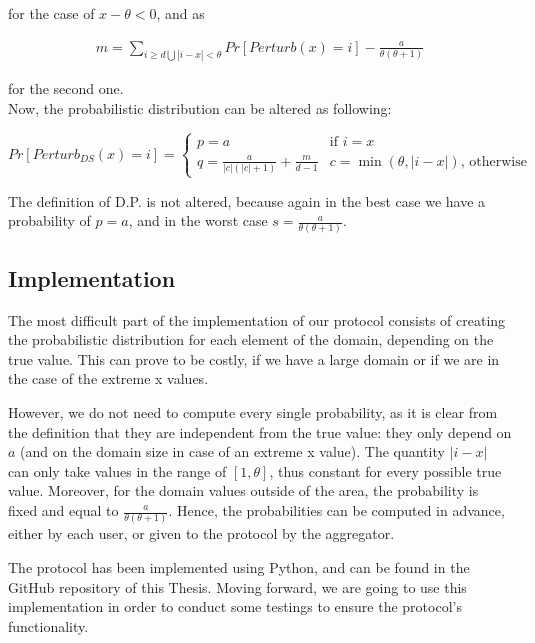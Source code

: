 for the case of $x - \theta < 0$, and as 

\begin{align*}
    m = \sum_{i \geq d \bigcup |i-x|<\theta} Pr[Perturb(x) = i] - \frac{a}{\theta(\theta+1)}
\end{align*}

for the second one.
\\\bigskip
Now, the probabilistic distribution can be altered as following: 


\begin{equation*}
    Pr[Perturb_{DS}(x) = i] =
	\begin{cases}
		p = a & \mbox{if } i = x \\
		q = \frac{a}{|c|(|c| + 1)} + \frac{m}{d - 1}  &  c = \min{(\theta, |i-x|)}  \mbox{, otherwise}	\end{cases}
\end{equation*}
 

The definition of D.P. is not altered, because again in the best case we have a probability of $p = a$, and in the worst case $s = \frac{a}{\theta(\theta+1)}$.

\subsection{Implementation}

The most difficult part of the implementation of our protocol consists of creating the probabilistic distribution for each element of the domain, depending on the true value. This can prove to be costly, if we have a large domain or if we are in the case of the extreme x values.

However, we do not need to compute every single probability, as it is clear from the definition that they are independent from the true value: they only depend on $a$ (and on the domain size in case of an extreme x value). The quantity $|i - x|$ can only take values in the range of $[1,\theta]$, thus constant for every possible true value. Moreover, for the domain values outside of the area, the probability is fixed and equal to $\frac{a}{\theta(\theta + 1)}$. Hence, the probabilities can be computed in advance, either by each user, or given to the protocol by the aggregator. 

The protocol has been implemented using Python, and can be found in the GitHub repository of this Thesis. Moving forward, we are going to use this implementation in order to conduct some testings to ensure the protocol's functionality.

